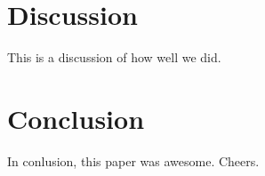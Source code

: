 \documentclass{article} %
\begin{document}
\begin{comment}
\begin{figure}[H]
\begin{center}
\fbox{\texttt{[image: scatter\_results]}}
\end{center}
\caption{Performance of the edge weight inference algorithm for a graph with $|V| = 100$ and $|E|= 348$}
\label{fig:scatter1}
\end{figure}
\end{comment}

\section{Discussion}
This is a discussion of how well we did.

\section{Conclusion}
In conlusion, this paper was awesome. Cheers.



\end{document}
